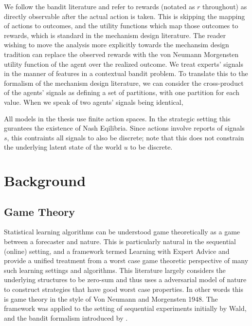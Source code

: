 We follow the bandit literature and refer to rewards (notated as $r$ throughout) as directly observable after the actual action is taken. This is skipping the mapping of actions to outcomes, and the utility functions which map those outcomes to rewards, which is standard in the mechanism design literature. The reader wishing to move the analysis more explicitly towards the mechansim design tradition can replace the observed rewards with the von Neumann Morgensten utility function of the agent over the realized outcome.
We treat experts' signals in the manner of features in a contextual bandit problem. To translate this to the formalism of the mechanism design literature, we can consider the cross-product of the agents' signals as defining a set of partitions, with one partition for each value. 
When we speak of two agents' signals being identical, 


All models in the thesis use finite action spaces. 
In the strategic setting this gurantees the existence of Nash Eqilibria. 
Since actions involve reports of signals $s$, this contraints all signals to also be discrete; note that this does not constrain the underlying latent state of the world $u$ to be discrete.


\section{Background}
\subsection{Game Theory}

Statistical learning algorithms can be understood game theoretically as a game between a forecaster and nature. This is particularly natural in the sequential (online) setting, and a framework termed Learning with Expert Advice and \cite{cesa2006prediction} provide a unified treatment from a worst case game theoretic perspective of many such learning settings and algorithms.
This literature largely considers the underlying structures to be zero-sum and thus uses a adversarial model of nature to construct strategies that have good worst case properties. In other words this is game theory in the style of Von Neumann and Morgensten 1948. The framework was applied to the setting of sequential experiments initially by Wald, and the bandit formalism introduced by \cite{robbins1952some}.

